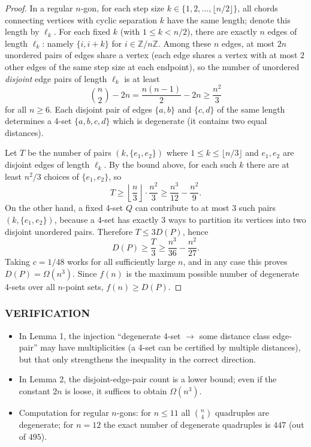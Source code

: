 \begin{proof}
In a regular \(n\)-gon, for each step size \(k\in\{1,2,\dots,\lfloor n/2\rfloor\}\), all chords connecting vertices with cyclic separation \(k\) have the same length; denote this length by \(\ell_k\).
For each fixed \(k\) (with \(1\le k< n/2\)), there are exactly \(n\) edges of length \(\ell_k\): namely \(\{i,i+k\}\) for \(i\in\mathbb{Z}/n\mathbb{Z}\).
Among these \(n\) edges, at most \(2n\) unordered pairs of edges share a vertex (each edge shares a vertex with at most \(2\) other edges of the same step size at each endpoint), so the number of unordered \emph{disjoint} edge pairs of length \(\ell_k\) is at least
\[
\binom{n}{2}-2n = \frac{n(n-1)}{2}-2n \ge \frac{n^2}{3}
\]
for all \(n\ge 6\).
Each disjoint pair of edges \(\{a,b\}\) and \(\{c,d\}\) of the same length determines a 4-set \(\{a,b,c,d\}\) which is degenerate (it contains two equal distances).

Let \(T\) be the number of pairs \((k,\{e_1,e_2\})\) where \(1\le k\le \lfloor n/3\rfloor\) and \(e_1,e_2\) are disjoint edges of length \(\ell_k\).
By the bound above, for each such \(k\) there are at least \(n^2/3\) choices of \(\{e_1,e_2\}\), so
\[
T \ge \left\lfloor\frac{n}{3}\right\rfloor\cdot \frac{n^2}{3} \ge \frac{n^3}{12}-\frac{n^2}{9}.
\]
On the other hand, a fixed 4-set \(Q\) can contribute to at most \(3\) such pairs \((k,\{e_1,e_2\})\), because a 4-set has exactly \(3\) ways to partition its vertices into two disjoint unordered pairs.
Therefore \(T\le 3D(P)\), hence
\[
D(P)\ge \frac{T}{3} \ge \frac{n^3}{36}-\frac{n^2}{27}.
\]
Taking \(c=1/48\) works for all sufficiently large \(n\), and in any case this proves \(D(P)=\Omega(n^3)\).
Since \(f(n)\) is the maximum possible number of degenerate 4-sets over all \(n\)-point sets, \(f(n)\ge D(P)\).
\end{proof}

\subsubsection*{VERIFICATION}
\begin{itemize}
\item In Lemma 1, the injection ``degenerate 4-set \(\to\) some distance class edge-pair'' may have multiplicities (a 4-set can be certified by multiple distances), but that only strengthens the inequality in the correct direction.
\item In Lemma 2, the disjoint-edge-pair count is a lower bound; even if the constant \(2n\) is loose, it suffices to obtain \(\Omega(n^3)\).
\item Computation for regular \(n\)-gons: for \(n\le 11\) all \(\binom{n}{4}\) quadruples are degenerate; for \(n=12\) the exact number of degenerate quadruples is \(447\) (out of \(495\)).
\end{itemize}

